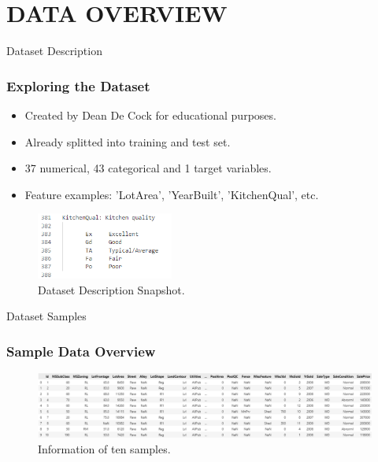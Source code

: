 \section{DATA OVERVIEW}
\label{data_overview_section}


\begin{frame}{Dataset Description}
    \frametitle{Exploring the Dataset}
    \begin{itemize}
        \item Created by Dean De Cock for educational purposes.
        \item Already splitted into training and test set.
        \item 37 numerical, 43 categorical and 1 target variables.
        \item Feature examples: 'LotArea', 'YearBuilt', 'KitchenQual', etc.
    \end{itemize}
    \vspace{0.5cm}
    \begin{figure}
        \includegraphics[width=0.4\textwidth]{figures/data_description.png} 
        \caption{Dataset Description Snapshot.}
        \label{fig:dataset_description_snapshot}
    \end{figure}
\end{frame}


\begin{frame}{Dataset Samples}
    \frametitle{Sample Data Overview}
    \begin{figure}
        \includegraphics[width=1\textwidth]{figures/data_head.png} 
        \caption{Information of ten samples.}
        \label{fig:dataset_head}
    \end{figure}
\end{frame}

